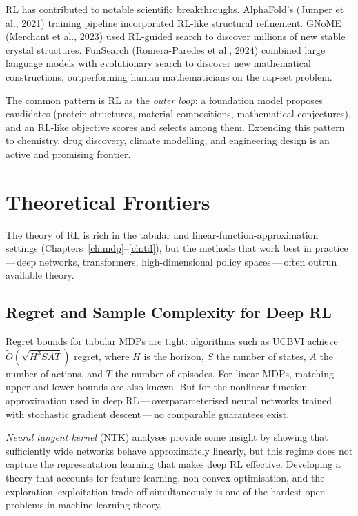 RL has contributed to notable scientific breakthroughs.  AlphaFold's
(Jumper et al., 2021) training pipeline incorporated RL-like
structural refinement.  GNoME (Merchant et al., 2023) used RL-guided
search to discover millions of new stable crystal structures.
FunSearch (Romera-Paredes et al., 2024) combined large language models
with evolutionary search to discover new mathematical constructions,
outperforming human mathematicians on the cap-set problem.

The common pattern is RL as the \emph{outer loop}: a foundation model
proposes candidates (protein structures, material compositions,
mathematical conjectures), and an RL-like objective scores and selects
among them.  Extending this pattern to chemistry, drug discovery,
climate modelling, and engineering design is an active and promising
frontier.


\section{Theoretical Frontiers}
\label{sec:open-theory}

The theory of RL is rich in the tabular and linear-function-approximation
settings (Chapters~\ref{ch:mdp}--\ref{ch:td}), but the methods that
work best in practice\,---\,deep networks, transformers, high-dimensional
policy spaces\,---\,often outrun available theory.

\subsection{Regret and Sample Complexity for Deep RL}

Regret bounds for tabular MDPs are tight: algorithms such as UCBVI
achieve $\tilde{O}(\sqrt{H^3 S A T})$ regret, where $H$ is the
horizon, $S$ the number of states, $A$ the number of actions, and $T$
the number of episodes.  For linear MDPs, matching upper and lower
bounds are also known.  But for the nonlinear function approximation
used in deep RL\,---\,overparameterised neural networks trained with
stochastic gradient descent\,---\,no comparable guarantees exist.

\emph{Neural tangent kernel} (NTK) analyses provide some insight by
showing that sufficiently wide networks behave approximately linearly,
but this regime does not capture the representation learning that
makes deep RL effective.  Developing a theory that accounts for
feature learning, non-convex optimisation, and the
exploration--exploitation trade-off simultaneously is one of the
hardest open problems in machine learning theory.

